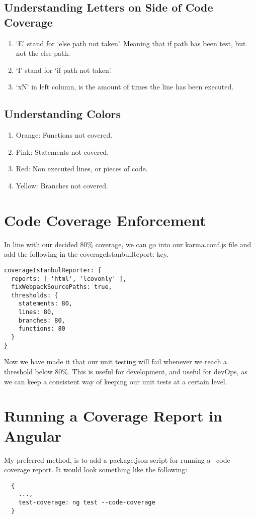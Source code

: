 \subsection{Understanding Letters on Side of Code Coverage}
\begin{enumerate}
  \item `E' stand for `else path not taken'. Meaning that if path has been test, but not the else path.
  \item `I' stand for `if path not taken'.
  \item `xN' in left column, is the amount of times the line has been executed.
\end{enumerate}

\subsection{Understanding Colors}
\begin{enumerate}
  \item Orange: Functions not covered.
  \item Pink: Statements not covered.
  \item Red: Non executed lines, or pieces of code.
  \item Yellow: Branches not covered.
\end{enumerate}

\section{ Code Coverage Enforcement }
In line with our decided 80\% coverage, we can go into our karma.conf.js file and add the following in the coverageIstanbulReport: key.
\begin{lstlisting}
coverageIstanbulReporter: {
  reports: [ 'html', 'lcovonly' ],
  fixWebpackSourcePaths: true,
  thresholds: {
    statements: 80,
    lines: 80,
    branches: 80,
    functions: 80
  }
}
\end{lstlisting}
Now we have made it that our unit testing will fail whenever we reach a threshold below 80\%. This is useful for development, and useful for devOps, as we can keep a consistent way of keeping our unit tests at a certain level.

\section{ Running a Coverage Report in Angular }
My preferred method, is to add a package.json script for running a --code-coverage report. It would look something like the following:
\begin{verbatim}
  {
    ...,
    test-coverage: ng test --code-coverage
  }
\end{verbatim}

